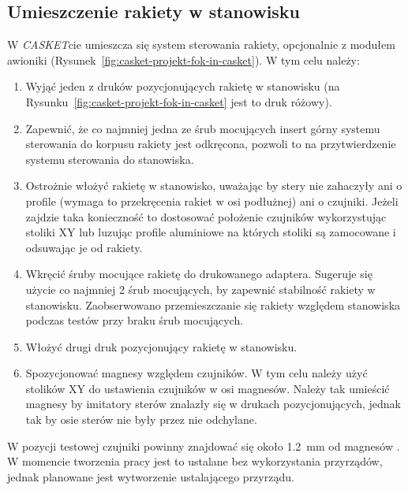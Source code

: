 \subsection{Umieszczenie rakiety w stanowisku}
\label{subsec:casket-umieszczenie}
W \textit{CASKET}cie umieszcza się system sterowania rakiety, opcjonalnie z modułem awioniki (Rysunek~\ref{fig:casket-projekt-fok-in-casket}). W tym celu należy:
\begin{enumerate}
    \item Wyjąć jeden z druków pozycjonujących rakietę w stanowisku (na Rysunku~\ref{fig:casket-projekt-fok-in-casket} jest to druk różowy).
    \item Zapewnić, że co najmniej jedna ze śrub mocujących insert górny systemu sterowania do korpusu rakiety jest odkręcona, pozwoli to na przytwierdzenie systemu sterowania do stanowiska.
    \item Ostrożnie włożyć rakietę w stanowisko, uważając by stery nie zahaczyły ani o profile (wymaga to przekręcenia rakiet w osi podłużnej) ani o czujniki. Jeżeli zajdzie taka konieczność to dostosować położenie czujników wykorzystując stoliki XY lub luzując profile aluminiowe na których stoliki są zamocowane i odsuwając je od rakiety.
    \item Wkręcić śruby mocujące rakietę do drukowanego adaptera. Sugeruje się użycie co najmniej 2 śrub mocujących, by zapewnić stabilność rakiety w stanowisku. Zaobserwowano przemieszczanie się rakiety względem stanowiska podczas testów przy braku śrub mocujących.
    \item Włożyć drugi druk pozycjonujący rakietę w stanowisku.
    \item Spozycjonować magnesy względem czujników. W tym celu należy użyć stolików XY do ustawienia czujników w osi magnesów. Należy tak umieścić magnesy by imitatory sterów znalazły się w drukach pozycjonujących, jednak tak by osie sterów nie były przez nie odchylane.
\end{enumerate}

W pozycji testowej czujniki powinny znajdować się około \SI{1.2}{\milli\meter} od magnesów \cite{mps_ma730gq_magnet_selection}. W momencie tworzenia pracy
jest to ustalane bez wykorzystania przyrządów, jednak planowane jest wytworzenie ustalającego przyrządu.

